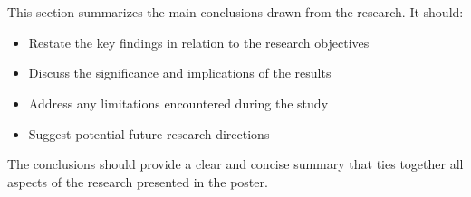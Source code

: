 \section*{}

This section summarizes the main conclusions drawn from the research. It should:

\begin{itemize}
\item Restate the key findings in relation to the research objectives
\item Discuss the significance and implications of the results
\item Address any limitations encountered during the study
\item Suggest potential future research directions
\end{itemize}

The conclusions should provide a clear and concise summary that ties together all aspects of the research presented in the poster.
